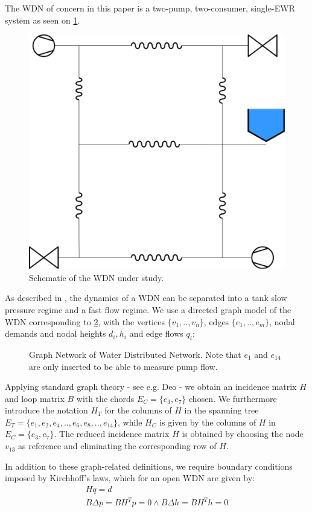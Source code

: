 The WDN of concern in this paper is a two-pump, two-consumer, single-EWR system as seen on \cref{fig:WDNModel}.

\begin{figure}[h]
	\centering
	\includegraphics[width=0.5\linewidth]{Graphics/WDNModel.pdf}
	\caption{Schematic of the WDN under study.}
	\label{fig:WDNModel}
\end{figure}

As described in , the dynamics of a WDN can be separated into a tank slow pressure regime and a fast flow regime. We use a directed graph model of the WDN corresponding to \cref{fig:tikzWDNGraph}, with the vertices $\{v_1,..,v_n\}$, edges $\{e_1,..,e_m\}$, nodal demands and nodal heights $d_i, h_i$ and edge flows $q_i$:

\begin{figure}[h!]
	\centering
	\resizebox{\columnwidth}{!}{
		}
		\caption{Graph Network of Water Distributed Network. Note that $e_1$ and $e_{14} $ are only inserted to be able to measure pump flow.}
	\label{fig:tikzWDNGraph}
\end{figure}  

Applying standard graph theory - see e.g. Deo \cite{Deo} - we obtain an incidence matrix $H$ and loop matrix $B$ with the chords $E_C=\{e_3,e_7\}$ chosen. We furthermore introduce the notation $H_T$ for the columns of $H$ in the spanning tree $E_T=\{e_1,e_2,e_4,..,e_6,e_8,..,e_{14}\}$, while $H_C$ is given by the columns of $H$ in $E_C=\{e_3,e_7\}$. The reduced incidence matrix $\bar{H}$ is obtained by choosing the node $ v_{13} $ as reference and eliminating the corresponding row of $H$.

In addition to these graph-related definitions, we require boundary conditions imposed by Kirchhoff's laws, which for an open WDN are given \cite{Rathore1030} by:
\begin{gather}
	Hq = d \label{eq:KirchNodeLaw} \\
	B\Delta p = B H^T p = 0 \wedge B\Delta h = B H^T h = 0 \label{eq:KirchMeshLaw}
\end{gather} 

